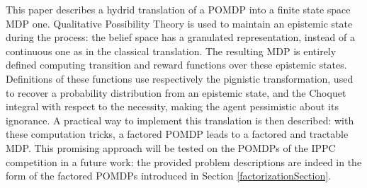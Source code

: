 This paper describes a hydrid translation 
of a POMDP into a finite state space MDP one. 
Qualitative Possibility Theory
is used to maintain an epistemic state during the process:
the belief space has a granulated representation,
instead of a continuous one as in the classical translation.
The resulting MDP is entirely defined computing transition and reward functions
over these epistemic states. 
Definitions of these functions 
use respectively the pignistic transformation,
used to recover a probability distribution 
from an epistemic state, 
and the Choquet integral with respect to the necessity, 
making the agent pessimistic about its ignorance. 
A practical way to implement this translation 
is then described:
with these computation tricks, 
a factored POMDP leads to a factored and tractable MDP. 
This promising approach 
will be tested on the POMDPs 
of the IPPC competition \cite{SannerIPPC11} in a future work:
the provided problem descriptions are indeed 
in the form of the factored POMDPs 
introduced in Section \ref{factorizationSection}.


